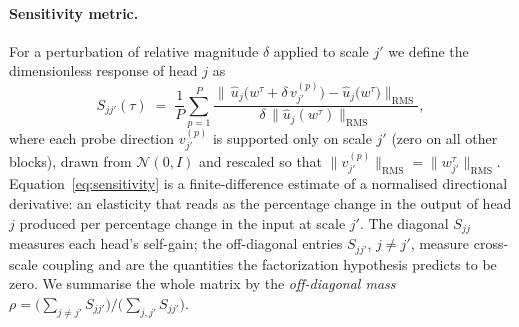 \paragraph{Sensitivity metric.}
For a perturbation of relative magnitude $\delta$ applied to scale $j'$ we
define the dimensionless response of head $j$ as
\begin{equation}
  S_{jj'}(\tau)
  \;=\;
  \frac{1}{P}\sum_{p=1}^{P}
  \frac{\big\lVert\,
      \hat{u}_j\!\big(w^{\tau}+\delta\,v^{(p)}_{j'}\big)
      -\hat{u}_j\!\big(w^{\tau}\big)
    \big\rVert_{\mathrm{RMS}}}
       {\delta\,\big\lVert \hat{u}_j(w^{\tau}) \big\rVert_{\mathrm{RMS}}},
  \label{eq:sensitivity}
\end{equation}
where each probe direction $v^{(p)}_{j'}$ is supported only on scale $j'$
(zero on all other blocks), drawn from $\mathcal{N}(0,I)$ and rescaled so that
$\lVert v^{(p)}_{j'}\rVert_{\mathrm{RMS}}=\lVert w^{\tau}_{j'}\rVert_{\mathrm{RMS}}$.
Equation~\eqref{eq:sensitivity} is a finite-difference estimate of a normalised
directional derivative: an elasticity that reads as the percentage change in the
output of head $j$ produced per percentage change in the input at scale $j'$.
The diagonal $S_{jj}$ measures each head's self-gain; the off-diagonal entries
$S_{jj'},\,j\neq j'$, measure cross-scale coupling and are the quantities the
factorization hypothesis predicts to be zero. We summarise the whole matrix by
the \emph{off-diagonal mass}
$\rho = \big(\sum_{j\neq j'} S_{jj'}\big)\big/\big(\sum_{j,j'} S_{jj'}\big)$.

